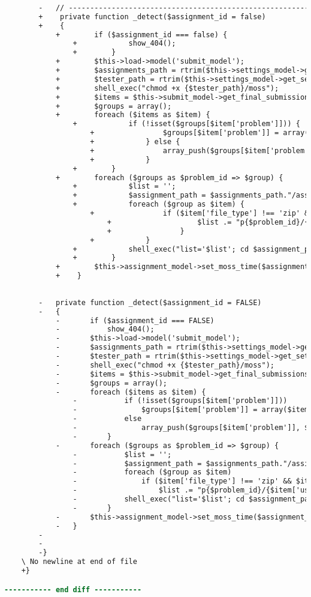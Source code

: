 \begin{lstlisting}[language=diff, caption=Perubahan pada kode Moss.php]
		
		-	// ------------------------------------------------------------------------
		+    private function _detect($assignment_id = false)
		+    {
			+        if ($assignment_id === false) {
				+            show_404();
				+        }
			+        $this->load->model('submit_model');
			+        $assignments_path = rtrim($this->settings_model->get_setting('assignments_root'), '/');
			+        $tester_path = rtrim($this->settings_model->get_setting('tester_path'), '/');
			+        shell_exec("chmod +x {$tester_path}/moss");
			+        $items = $this->submit_model->get_final_submissions($assignment_id, $this->user->level, $this->user->username);
			+        $groups = array();
			+        foreach ($items as $item) {
				+            if (!isset($groups[$item['problem']])) {
					+                $groups[$item['problem']] = array($item);
					+            } else {
					+                array_push($groups[$item['problem']], $item);
					+            }
				+        }
			+        foreach ($groups as $problem_id => $group) {
				+            $list = '';
				+            $assignment_path = $assignments_path."/assignment_{$assignment_id}";
				+            foreach ($group as $item) {
					+                if ($item['file_type'] !== 'zip' && $item['file_type'] !== 'pdf') {
						+                    $list .= "p{$problem_id}/{$item['username']}/{$item['file_name']}".'.'.filetype_to_extension($item['file_type']). " ";
						+                }
					+            }
				+            shell_exec("list='$list'; cd $assignment_path; $tester_path/moss \$list | grep http >p{$problem_id}/moss_link.txt;");
				+        }
			+        $this->assignment_model->set_moss_time($assignment_id);
			+    }
		
		
		-	private function _detect($assignment_id = FALSE)
		-	{
			-		if ($assignment_id === FALSE)
			-			show_404();
			-		$this->load->model('submit_model');
			-		$assignments_path = rtrim($this->settings_model->get_setting('assignments_root'), '/');
			-		$tester_path = rtrim($this->settings_model->get_setting('tester_path'), '/');
			-		shell_exec("chmod +x {$tester_path}/moss");
			-		$items = $this->submit_model->get_final_submissions($assignment_id, $this->user->level, $this->user->username);
			-		$groups = array();
			-		foreach ($items as $item) {
				-			if (!isset($groups[$item['problem']]))
				-				$groups[$item['problem']] = array($item);
				-			else
				-				array_push($groups[$item['problem']], $item);
				-		}
			-		foreach ($groups as $problem_id => $group) {
				-			$list = '';
				-			$assignment_path = $assignments_path."/assignment_{$assignment_id}";
				-			foreach ($group as $item)
				-				if ($item['file_type'] !== 'zip' && $item['file_type'] !== 'pdf')
				-					$list .= "p{$problem_id}/{$item['username']}/{$item['file_name']}".'.'.filetype_to_extension($item['file_type']). " ";
				-			shell_exec("list='$list'; cd $assignment_path; $tester_path/moss \$list | grep http >p{$problem_id}/moss_link.txt;");
				-		}
			-		$this->assignment_model->set_moss_time($assignment_id);
			-	}
		-
		-
		-}
	\ No newline at end of file
	+}

----------- end diff -----------
\end{lstlisting}

